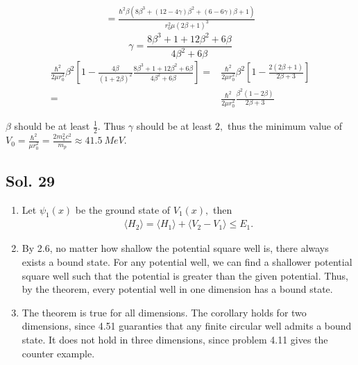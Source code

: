 \begin{enumerate}
\begin{align*}
        =
        \frac{\hbar^{2} {\beta} \left(8{\beta}^{3} + \left(12 - 4{\gamma}\right) {\beta}^{2} + \left(6 - 6{\gamma}\right) {\beta} + 1\right)}{r_{0}^{2} {\mu} \left(2{\beta} + 1\right)^{3}}
    \end{align*}
    $$
    \gamma = 
    \frac{8\beta^3+1+12\beta^2+6\beta}{4\beta^2+6\beta}
    $$
    \begin{align*}
        \frac{\hbar^2}{2\mu r_0^2}
        \beta^2 
        \left[
        1 - \frac{4\beta}{(1+2\beta)^2}
        \frac{8\beta^3+1+12\beta^2+6\beta}{4\beta^2+6\beta}
        \right]=
        &
        \frac{\hbar^2}{2\mu r_0^2}
        \beta^2 
        \left[
        1-\frac{2(2\beta+1)}{2\beta+3}
        \right]\\
        =&
        \frac{\hbar^2}{2\mu r_0^2}
        \frac{\beta^2 (1-2\beta)}{2\beta+3}
    \end{align*}
    
    $\beta$ should be at least $\frac{1}{2}.$ Thus $\gamma$ should be at least $2,$ thus the minimum value of $V_0=\frac{\hbar^2}{\mu r_0^2}=
    \frac{2m_\pi^2c^2}{m_p}\approx \qty{41.5}{MeV}.$
\end{enumerate}

\subsection*{Sol. 29}
\begin{enumerate}
    \item 
    Let $\psi_1(x)$ be the ground state of $V_1(x),$ then 
    \begin{align*}
        \langle H_2\rangle
        =\langle H_1\rangle
        +\langle V_2-V_1\rangle
        \leq E_1.
    \end{align*}
    \item By 2.6, no matter how shallow the potential square well is, there always exists a bound state.
    For any potential well, we can  find a shallower potential square well such that  the potential is greater than the given potential. Thus, by the theorem, every potential well in one dimension has a bound state.
    \item The theorem is true for all dimensions. The corollary holds for two dimensions, since 4.51 guaranties that any
    finite circular well admits a bound state.
    It does not hold in three dimensions, since problem 4.11 gives the counter example.
\end{enumerate}

